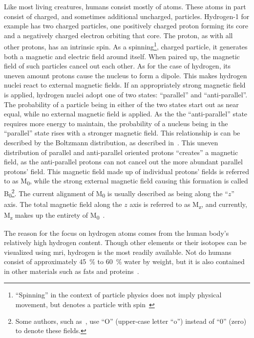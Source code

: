 Like most living creatures, humans consist mostly of atoms. %
These atoms in part consist of charged, and sometimes additional uncharged, 
particles. Hydrogen-1 for example has two charged particles, one positively 
charged proton forming its core and a negatively charged electron orbiting that
core. The proton, as with all other protons, has an intrinsic 
spin. As a spinning\footnote{\enquote{Spinning} in the context of particle 
physics does not imply physical movement, but denotes a particle with 
spin~\cite{introduction_to_particle_physics}}, %
charged particle, it generates 
both a magnetic and electric field around itself. 
When paired up, the magnetic %
field of such particles cancel out each other. As for the case of hydrogen, its 
uneven amount protons cause the nucleus to form a dipole. This makes hydrogen
nuclei react to external magnetic fields. If an appropriately strong magnetic 
field is applied, hydrogen nuclei adopt one of two states: \enquote{parallel} 
and \enquote{anti-parallel}. The probability of a particle being in either of 
the two states start out as near equal, while no external magnetic field is 
applied. As the the \enquote{anti-parallel} state requires more 
energy to maintain, the probability of a nucleus being
in the \enquote{parallel} state rises with a stronger magnetic field. This
relationship is can be described by the Boltzmann distribution, as described 
in~\cite[eq. 1.16]{medical_imaging}. This uneven distribution of parallel and 
anti-parallel oriented protons \enquote{creates} a magnetic field, as the 
anti-parallel protons can not cancel out the more abundant parallel protons' 
field. This magnetic field made up of individual protons' fields is referred to
as M\textsubscript{0}, while the strong external magnetic field causing this formation is 
called B\textsubscript{0}\footnote{Some authors, such as~\cite{mri_handbook}, use \enquote{O}
(upper-case letter \enquote{o}) instead of \enquote{0} (zero) to denote these
fields.}. The current alignment of M\textsubscript{0} is usually described as being along the
\enquote{$z$} axis. The total magnetic field along the $z$ axis is referred to
as M\textsubscript{z}, and currently, M\textsubscript{z} makes up the entirety of 
M\textsubscript{0}~\cite{introduction_to_particle_physics,mri_the_basics,medical_imaging}.

The reason for the focus on hydrogen atoms comes from the human body's 
relatively high hydrogen content. Though other elements or their isotopes can be
visualized using \ac{mri}, hydrogen is the most readily available. 
Not do humans consist of approximately 
\SI{45}{\percent} to \SI{60}{\percent} water by weight, but it is also contained in other materials such 
as fats and proteins~\cite{mri_the_basics,body_water_with_age,mri_handbook}.


